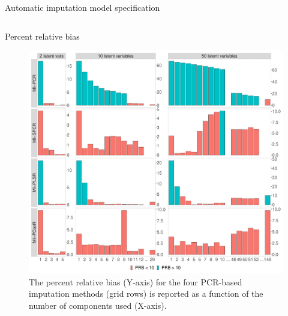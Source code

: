 \documentclass{beamer}\usepackage[]{graphicx}\usepackage[]{xcolor}
\makeatletter
\def\maxwidth{ %
  \ifdim\Gin@nat@width>\linewidth
    \linewidth
  \else
    \Gin@nat@width
  \fi
}
\newenvironment{knitrout}{}{} %
\makeatother
\begin{document}
\begin{frame}[fragile]
\begin{columns}[T]
\begin{column}{.42\textwidth}
\begin{block}{Automatic imputation model specification}
\end{block}

\end{column}

\end{columns}

\bigskip
{\hrulefill}
\bigskip


\begin{columns}


  \begin{column}{.46\textwidth}
    \begin{block}{Percent relative bias}

      \begin{figure}
        \centering
\begin{knitrout}
\color{fgcolor}

{\centering \includegraphics[width=\maxwidth]{figure/plot-prb-1} 

}


\end{knitrout}
          \caption{
            \label{fig:prb-text} 
            The percent relative bias (Y-axis) for the four PCR-based imputation methods (grid rows) is reported as a function of the number of components used (X-axis).
            }
        \end{figure}
        

\end{block}
\end{column}
\end{columns}
\end{frame}
\end{document}
